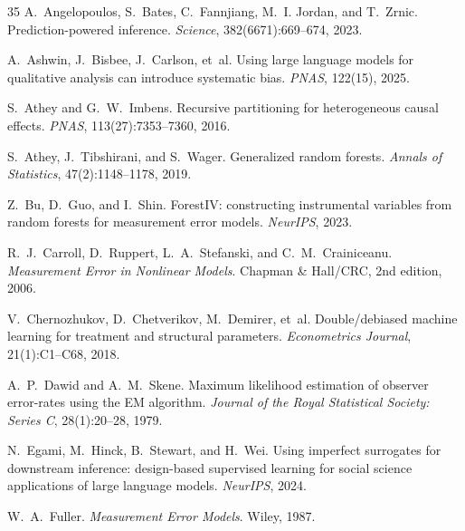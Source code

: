 \documentclass[11pt,twocolumn]{article}
\begin{document}


\begin{thebibliography}{35}
A.~Angelopoulos, S.~Bates, C.~Fannjiang, M.~I. Jordan, and T.~Zrnic.
\newblock Prediction-powered inference.
\newblock \emph{Science}, 382(6671):669--674, 2023.

A.~Ashwin, J.~Bisbee, J.~Carlson, et~al.
\newblock Using large language models for qualitative analysis can introduce systematic bias.
\newblock \emph{PNAS}, 122(15), 2025.

S.~Athey and G.~W.~Imbens.
\newblock Recursive partitioning for heterogeneous causal effects.
\newblock \emph{PNAS}, 113(27):7353--7360, 2016.

S.~Athey, J.~Tibshirani, and S.~Wager.
\newblock Generalized random forests.
\newblock \emph{Annals of Statistics}, 47(2):1148--1178, 2019.

Z.~Bu, D.~Guo, and I.~Shin.
\newblock ForestIV: constructing instrumental variables from random forests for measurement error models.
\newblock \emph{NeurIPS}, 2023.

R.~J.~Carroll, D.~Ruppert, L.~A.~Stefanski, and C.~M.~Crainiceanu.
\newblock \emph{Measurement Error in Nonlinear Models}.
\newblock Chapman \& Hall/CRC, 2nd edition, 2006.

V.~Chernozhukov, D.~Chetverikov, M.~Demirer, et~al.
\newblock Double/debiased machine learning for treatment and structural parameters.
\newblock \emph{Econometrics Journal}, 21(1):C1--C68, 2018.

A.~P.~Dawid and A.~M.~Skene.
\newblock Maximum likelihood estimation of observer error-rates using the {EM} algorithm.
\newblock \emph{Journal of the Royal Statistical Society: Series C}, 28(1):20--28, 1979.

N.~Egami, M.~Hinck, B.~Stewart, and H.~Wei.
\newblock Using imperfect surrogates for downstream inference: design-based supervised learning for social science applications of large language models.
\newblock \emph{NeurIPS}, 2024.

W.~A.~Fuller.
\newblock \emph{Measurement Error Models}.
\newblock Wiley, 1987.


\end{thebibliography}
\end{document}
